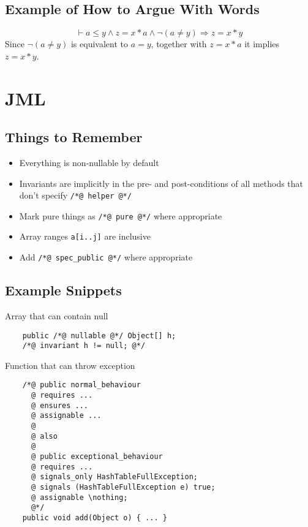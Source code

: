 \documentclass[landscape]{cheat}
\begin{document}
\begin{multicols*}{3}
\subsection{Example of How to Argue With Words}
\begin{equation*}
    \vdash a \leq y \land z = x * a \land \lnot (a \neq y) \Rightarrow z = x * y
\end{equation*}
Since $\lnot (a \neq y)$ is equivalent to $a = y$, together with $z = x * a$ it implies $z = x * y$.

\section{JML}
\subsection{Things to Remember}
\begin{itemize}
    \item Everything is non-nullable by default
    \item Invariants are implicitly in the pre- and post-conditions of all methods that don't specify \texttt{/*@ helper @*/}
    \item Mark pure things as \texttt{/*@ pure @*/} where appropriate
    \item Array ranges \texttt{a[i..j]} are inclusive
    \item Add \texttt{/*@ spec\_public @*/} where appropriate
\end{itemize}

\subsection{Example Snippets}
Array that can contain null
\begin{lstlisting}
    public /*@ nullable @*/ Object[] h;
    /*@ invariant h != null; @*/
\end{lstlisting}

Function that can throw exception
\begin{lstlisting}
    /*@ public normal_behaviour
      @ requires ...
      @ ensures ...
      @ assignable ...
      @
      @ also
      @
      @ public exceptional_behaviour
      @ requires ...
      @ signals_only HashTableFullException;
      @ signals (HashTableFullException e) true;
      @ assignable \nothing;
      @*/
    public void add(Object o) { ... }
\end{lstlisting}


\end{multicols*}
\end{document}
